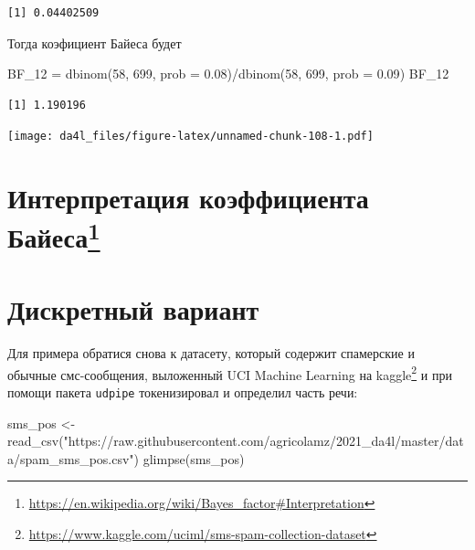 \documentclass[
]{book}
\newenvironment{Shaded}{\begin{snugshade}}{\end{snugshade}}
\newcommand{\AttributeTok}[1]{\textcolor[rgb]{0.77,0.63,0.00}{#1}}
\newcommand{\DecValTok}[1]{\textcolor[rgb]{0.00,0.00,0.81}{#1}}
\newcommand{\FloatTok}[1]{\textcolor[rgb]{0.00,0.00,0.81}{#1}}
\newcommand{\FunctionTok}[1]{\textcolor[rgb]{0.00,0.00,0.00}{#1}}
\newcommand{\NormalTok}[1]{#1}
\newcommand{\OtherTok}[1]{\textcolor[rgb]{0.56,0.35,0.01}{#1}}
\newcommand{\SpecialCharTok}[1]{\textcolor[rgb]{0.00,0.00,0.00}{#1}}
\newcommand{\StringTok}[1]{\textcolor[rgb]{0.31,0.60,0.02}{#1}}
\renewcommand{\href}[2]{#2\footnote{\url{#1}}}
\begin{document}
\begin{verbatim}
[1] 0.04402509
\end{verbatim}

Тогда коэфициент Байеса будет

\begin{Shaded}
\begin{Highlighting}[]
\NormalTok{BF\_12 }\OtherTok{=} \FunctionTok{dbinom}\NormalTok{(}\DecValTok{58}\NormalTok{, }\DecValTok{699}\NormalTok{, }\AttributeTok{prob =} \FloatTok{0.08}\NormalTok{)}\SpecialCharTok{/}\FunctionTok{dbinom}\NormalTok{(}\DecValTok{58}\NormalTok{, }\DecValTok{699}\NormalTok{, }\AttributeTok{prob =} \FloatTok{0.09}\NormalTok{)}
\NormalTok{BF\_12}
\end{Highlighting}
\end{Shaded}

\begin{verbatim}
[1] 1.190196
\end{verbatim}

\texttt{[image: da4l\_files/figure-latex/unnamed-chunk-108-1.pdf]}

\hypertarget{ux438ux43dux442ux435ux440ux43fux440ux435ux442ux430ux446ux438ux44f-ux43aux43eux44dux444ux444ux438ux446ux438ux435ux43dux442ux430-ux431ux430ux439ux435ux441ux430}{%
\section{\texorpdfstring{\href{https://en.wikipedia.org/wiki/Bayes_factor\#Interpretation}{Интерпретация коэффициента Байеса}}{Интерпретация коэффициента Байеса}}\label{ux438ux43dux442ux435ux440ux43fux440ux435ux442ux430ux446ux438ux44f-ux43aux43eux44dux444ux444ux438ux446ux438ux435ux43dux442ux430-ux431ux430ux439ux435ux441ux430}}

\hypertarget{ux434ux438ux441ux43aux440ux435ux442ux43dux44bux439-ux432ux430ux440ux438ux430ux43dux442}{%
\section{Дискретный вариант}\label{ux434ux438ux441ux43aux440ux435ux442ux43dux44bux439-ux432ux430ux440ux438ux430ux43dux442}}

Для примера обратися снова к датасету, который содержит спамерские и обычные смс-сообщения, выложенный UCI Machine Learning \href{https://www.kaggle.com/uciml/sms-spam-collection-dataset}{на kaggle} и при помощи пакета \texttt{udpipe} токенизировал и определил часть речи:

\begin{Shaded}
\begin{Highlighting}[]
\NormalTok{sms\_pos }\OtherTok{\textless{}{-}} \FunctionTok{read\_csv}\NormalTok{(}\StringTok{"https://raw.githubusercontent.com/agricolamz/2021\_da4l/master/data/spam\_sms\_pos.csv"}\NormalTok{)}
\FunctionTok{glimpse}\NormalTok{(sms\_pos)}
\end{Highlighting}
\end{Shaded}
\end{document}
